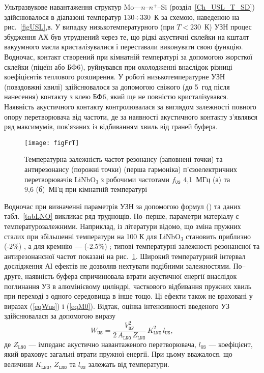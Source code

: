 Ультразвукове навантаження структур Mo---$n$--$n^+$--Si (розділ~\ref{Ch_USL_T_SD}) здійснювалося в діапазоні температур 130$\div$330~К за схемою, наведеною на рис.~\ref{figUSL},в.
У випадку низькотемпературного (при $T<230$~К) УЗН процес збудження АХ був утруднений через те, що
рідкі акустичні склейки на кшталт вакуумного масла кристалізувалися і переставали виконувати свою функцію.
Водночас, контакт створений при кімнатній температурі за допомогою жорсткої склейки (піцеїн або БФ6),
руйнувався при охолодженні внаслідок різниці коефіцієнтів теплового розширення.
У роботі низькотемпературне УЗН (повздовжні хвилі) здійснювалося за допомогою свіжого (до 5~год після нанесення) контакту з клею БФ6,
який ще не повністю кристалізувався.
Наявність акустичного контакту контролювалася за виглядом залежності повного опору перетворювача від частоти,
де за наявності акустичного контакту з'являвся ряд максимумів, пов'язаних із відбиванням хвиль від граней буфера.

\begin{figure}
\center
\texttt{[image: figFrT]}%
\caption{\label{figFrT}
Температурна залежність частот резонансу (заповнені точки) та антирезонансу (порожні точки) (перша гармоніка)
п'єзоелектричних перетворювачів LiNbO$_3$ з робочими частотами $f_\mathtt{US}$ 4,1~МГц (а) та 9,6 (б)~МГц при кімнатній температурі
}
\end{figure}


Водночас при визначенні параметрів УЗН за допомогою формул () та даних табл.~\ref{tabLNO} викликає ряд труднощів.
По--перше, параметри матеріалу є температурозалежними.
Наприклад, із літератури відомо, що зміна пружних сталих при збільшенні температури на 100 К для LiNbO$_3$ становить приблизно (-2\%) \cite{LNO_C:Temp},
а для кремнію --- (-2.5\%) \cite{Si_C:Temp};
типові температурні залежності резонансної та антирезонансної частот показані на рис.~\ref{figFrT}.
Широкий температурний інтервал дослідження АІ ефектів не дозволяв нехтувати подібними залежностями.
По--друге, наявність буфера спричинювала втрати акустичної енергії внаслідок поглинання УЗ в алюмінієвому циліндрі, часткового відбивання пружних хвиль
при переході з одного середовища в інше тощо.
Ці ефекти також не враховані у виразах (\ref{eqWus}) і  (\ref{eqM0}).
Відтак, оцінка інтенсивності введеного УЗ здійснювалася за допомогою виразу
 \begin{equation}
 \label{eqWus2}
 W_\mathtt{US}=\frac{V_\mathtt{RF}^2}{2\,A_\mathtt{LNO}\,Z_\mathtt{LNO}}\,K_\mathtt{LNO}^2\,l_\mathtt{US},
 \end{equation}
де
$Z_\mathtt{LNO}$ --- імпеданс акустично навантаженого перетворювача,
$l_\mathtt{US}$ --- коефіцієнт, який враховує загальні втрати пружної енергії.
При цьому вважалося, що величини
$K_\mathtt{LNO}$, $Z_\mathtt{LNO}$ та $l_\mathtt{US}$ залежать від температури.

